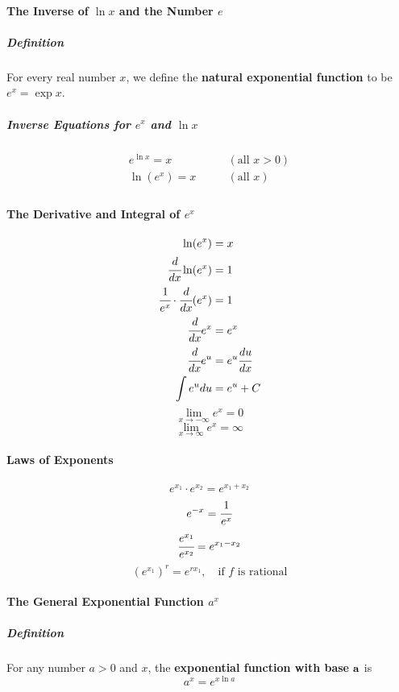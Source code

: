 \documentclass{article}
\begin{document}
            \paragraph{The Inverse of $\ln x$ and the Number $e$}
                \subparagraph{Definition} For every real number $x$, we define the \textbf{natural exponential function} to be $e^x=\exp x$.
                \subparagraph{Inverse Equations for $e^x$ and $\ln x$}
                \begin{equation}
                    \begin{aligned}
                        e^{\ln x}=x&\qquad (\text{all } x>0)\\
                        \ln(e^x)=x&\qquad (\text{all } x)\\
                    \end{aligned}
                \end{equation}
            \paragraph{The Derivative and Integral of $e^x$}
            \begin{equation}
                \begin{aligned}
                    \ln (e^x)&=x\\
                    \cfrac{d}{dx}\ln (e^x)&=1\\
                    \cfrac{1}{e^x}\cdot\cfrac{d}{dx}(e^x)&=1\\
                    \cfrac{d}{dx}e^x&=e^x\\
                    \cfrac{d}{dx}e^u&=e^u\cfrac{du}{dx}\\
                    \int e^u du&=e^u+C\\
                \end{aligned}
            \end{equation}
            \[\lim\limits_{x\to -\infty} e^x=0\]
            \[\lim\limits_{x\to \infty} e^x=\infty\]
            \paragraph{Laws of Exponents}
                \[e^{x_1}\cdot e^{x_2}=e^{x_1+x_2}\]
                \[e^{-x}=\cfrac{1}{e^x}\]
                \[\cfrac{e^{x_1}}{e^{x_2}}=e^{x_1-x_2}\]
                \[(e^{x_1})^r=e^{rx_1},\quad \text{if $f$ is rational}\]
            \paragraph{The General Exponential Function $a^x$}
                \subparagraph{Definition} For any number $a>0$ and $x$, the \textbf{exponential function with base }$\bf{a}$ is
                \[a^x=e^{x\ln a}\]
\end{document}
